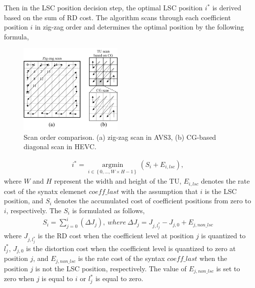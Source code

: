 \documentclass[lettersize,journal]{IEEEtran}
\begin{document}
Then in the LSC position decision step, the optimal LSC position $i_{}^{*}$ is derived based on the sum of RD cost. The algorithm scans through each coefficient position $i$ in zig-zag order and determines the optimal position by the following formula,
\begin{figure}[!h]
	\centering
	\centerline{\includegraphics[width=0.45\textwidth]{figure/scan.png}} 
	\caption{Scan order comparison. (a) zig-zag scan in AVS3, (b) CG-based diagonal scan in HEVC.}
	\label{scan} %
\end{figure}

\begin{equation}
	\begin{aligned}
		\label{i_optimal}
		i_{}^{*} =\mathop{\arg\min}\limits_{i \in \left \{ 0,...,W\times H-1\right \} } \left ( S_{i} + E_{i,lsc}   \right ),
	\end{aligned}
\end{equation}
where $W$ and $H$ represent the width and height of the TU, $E_{i,lsc}$ denotes the rate cost of the synatx elemenet $coeff\_last$ with the assumption that $i$ is the LSC position, and $S_{i}$ denotes the accumulated cost of coefficient positions from zero to $i$, respectively. The $S_{i}$ is formulated as follows, 
\begin{equation}
	\begin{aligned}
		\label{A_i,last}
S_{i} = \sum_{j=0}^{i}\left ( \Delta J_{j} \right), \ where \   \Delta J_{j} = J_{j,l_{j}^{*}} - J_{j,0} + E_{j,non\_lsc}
	\end{aligned}
\end{equation}
where $J_{j,l_{j}^{*}}$ is the RD cost when the coefficient level at position $j$ is quantized to $l_{j}^{*}$, $J_{j,0}$ is the distortion cost when the coefficient level is quantized to zero at position $j$, and $E_{j,non\_lsc}$ is the rate cost of the syntax $coeff\_last$ when the position $j$ is not the LSC position, respectively. The value of $E_{j,non\_lsc}$ is set to zero when $j$ is equal to $i$ or $l_{j}^{*}$ is equal to zero. 
\end{document}
